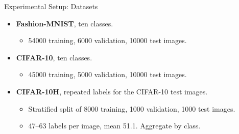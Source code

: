 \begin{frame}{Experimental Setup: Datasets}
\label{frm:cat-ebnn-evaluation}
\begin{itemize}
\setlength{\itemsep}{4mm}
\item \textbf{Fashion-MNIST}, ten classes.
\begin{itemize}
\item 54000 training, 6000 validation, 10000 test images.
\end{itemize}
\item \textbf{CIFAR-10}, ten classes.
\begin{itemize}
\item 45000 training, 5000 validation, 10000 test images.
\end{itemize}
\item \textbf{CIFAR-10H}, repeated labels for the CIFAR-10 test images.
\begin{itemize}
\item Stratified split of 8000 training, 1000 validation, 1000 test images.
\item 47--63 labels per image, mean 51.1. Aggregate by class.
\end{itemize}
\end{itemize}
\end{frame}

